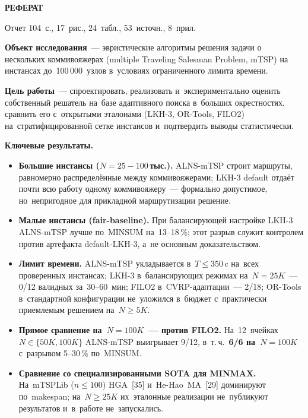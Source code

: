 \documentclass[a4paper,14pt]{extreport}
\newcommand{\sectiontitle}[1]{%
  \begin{center}\textbf{\MakeUppercase{#1}}\end{center}\par\bigskip}
\begin{document}
\sectiontitle{Реферат}

Отчет 104~с., 17~рис., 24~табл., 53~источн., 8~прил.

\medskip

\textbf{Объект исследования}~--- эвристические алгоритмы решения задачи о нескольких коммивояжерах (multiple Traveling Salesman Problem, mTSP) на инстансах до~100\,000~узлов в~условиях ограниченного лимита времени.

\textbf{Цель работы}~--- спроектировать, реализовать и~экспериментально оценить собственный решатель на~базе адаптивного поиска в~больших окрестностях, сравнить его с~открытыми эталонами (LKH-3, OR-Tools, FILO2) на~стратифицированной сетке инстансов и~подтвердить выводы статистически.

\medskip
\textbf{Ключевые результаты.}
\begin{itemize}\setlength\itemsep{2pt}
\item \textbf{Большие инстансы ($N=25{-}100$\,тыс.).} ALNS-mTSP строит маршруты, равномерно распределённые между коммивояжерами; LKH-3 default отдаёт почти всю работу одному коммивояжеру~--- формально допустимое, но~непригодное для прикладной маршрутизации решение.
\item \textbf{Малые инстансы (fair-baseline).} При балансирующей настройке LKH-3 ALNS-mTSP лучше по~MINSUM на~13--18\,\%; этот разрыв служит контролем против артефакта default-LKH-3, а~не основным доказательством.
\item \textbf{Лимит времени.} ALNS-mTSP укладывается в~$T\leq 350$\,c на~всех проверенных инстансах; LKH-3 в~балансирующих режимах на~$N=25K$~--- 0/12 валидных за~30--60~мин; FILO2 в~CVRP-адаптации~--- 2/18; OR-Tools в~стандартной конфигурации не~уложился в~бюджет с~практически приемлемым решением на~$N\geq 5K$.
\item \textbf{Прямое сравнение на~$N=100K$~--- против FILO2.} На~12~ячейках $N\in\{50K,100K\}$ ALNS-mTSP выигрывает 9/12, в~т.\,ч.\ \textbf{6/6 на~$N=100K$} с~разрывом 5--30\,\% по~MINSUM.
\item \textbf{Сравнение со специализированными SOTA для MINMAX.} На~mTSPLib ($n\leq 100$) HGA~[35] и~He-Hao~MA~[29] доминируют по~makespan; на~$N\geq 25K$ их~эталонные реализации не~публикуют результатов и~в~работе не~запускались.
\end{itemize}

\medskip
\noindent{}
\end{document}
